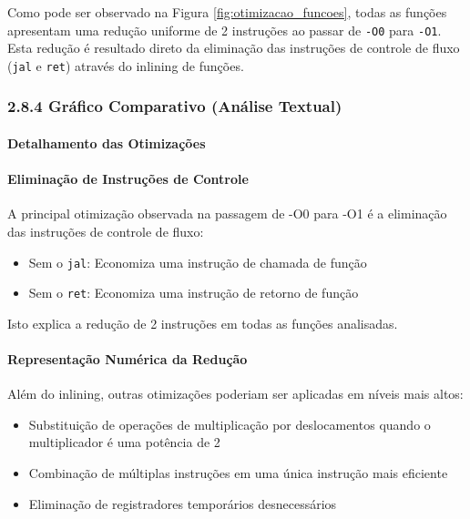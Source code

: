 \documentclass[12pt,a4paper]{article}
\begin{document}
Como pode ser observado na Figura \ref{fig:otimizacao_funcoes}, todas as funções apresentam uma redução uniforme de 2 instruções ao passar de \texttt{-O0} para \texttt{-O1}. Esta redução é resultado direto da eliminação das instruções de controle de fluxo (\texttt{jal} e \texttt{ret}) através do inlining de funções.

\subsubsection*{2.8.4 Gráfico Comparativo (Análise Textual)}
\paragraph{Detalhamento das Otimizações}
\paragraph{Eliminação de Instruções de Controle}
A principal otimização observada na passagem de -O0 para -O1 é a eliminação das instruções de controle de fluxo:
\begin{itemize}
    \item Sem o \texttt{jal}: Economiza uma instrução de chamada de função
    \item Sem o \texttt{ret}: Economiza uma instrução de retorno de função
\end{itemize}
Isto explica a redução de 2 instruções em todas as funções analisadas.

\paragraph{Representação Numérica da Redução}
Além do inlining, outras otimizações poderiam ser aplicadas em níveis mais altos:
\begin{itemize}
    \item Substituição de operações de multiplicação por deslocamentos quando o multiplicador é uma potência de 2
    \item Combinação de múltiplas instruções em uma única instrução mais eficiente
    \item Eliminação de registradores temporários desnecessários
\end{itemize}
\end{document}
